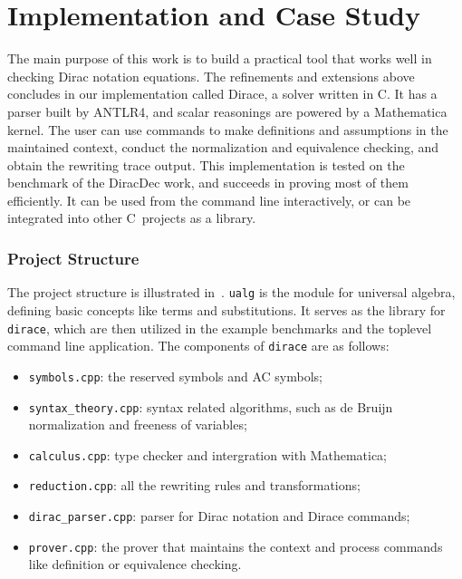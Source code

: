 \documentclass[runningheads]{llncs}
\newcommand{\CC}{C\nolinebreak\hspace{-.05em}\raisebox{.4ex}{\tiny\bf +}\nolinebreak\hspace{-.10em}\raisebox{.4ex}{\tiny\bf +}}
\def\CC{{C\nolinebreak[4]\hspace{-.05em}\raisebox{.4ex}{\tiny\bf ++}}}
\begin{document}




\section{Implementation and Case Study}

The main purpose of this work is to build a practical tool that works well in checking Dirac notation equations. The refinements and extensions above concludes in our implementation called Dirace, a solver written in \CC. It has a parser built by ANTLR4, and scalar reasonings are powered by a Mathematica kernel. The user can use commands to make definitions and assumptions in the maintained context, conduct the normalization and equivalence checking, and obtain the rewriting trace output. This implementation 
is tested on the benchmark of the DiracDec work, and succeeds in proving most of them efficiently. 
It can be used from the command line interactively, or can be integrated into other \CC\ projects as a library.

\subsubsection{Project Structure}
The project structure is illustrated in~.
\texttt{ualg} is the module for universal algebra, defining basic concepts like terms and substitutions. It serves as the library for \texttt{dirace}, which are then utilized in the example benchmarks and the toplevel command line application. The components of \texttt{dirace} are as follows:
\begin{itemize}
    \item \texttt{symbols.cpp}: the reserved symbols and AC symbols;
    \item \texttt{syntax\_theory.cpp}: syntax related algorithms, such as de Bruijn normalization and freeness of variables;
    \item \texttt{calculus.cpp}: type checker and intergration with Mathematica;
    \item \texttt{reduction.cpp}: all the rewriting rules and transformations;
    \item \texttt{dirac\_parser.cpp}: parser for Dirac notation and Dirace commands;
    \item \texttt{prover.cpp}: the prover that maintains the context and process commands like definition or equivalence checking.
\end{itemize}
\end{document}

